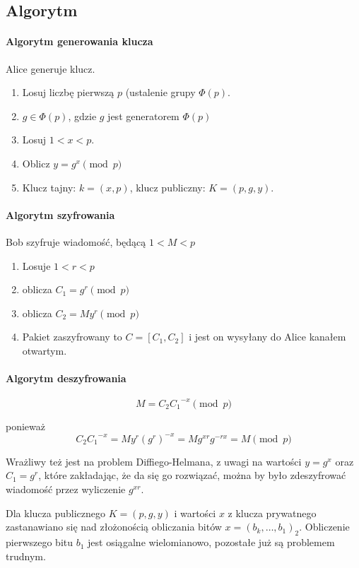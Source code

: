 \documentclass{report}
\begin{document}
\subsection{Algorytm}

\paragraph{Algorytm generowania klucza}

Alice generuje klucz.

\begin{enumerate}
\item Losuj liczbę pierwszą $p$ (ustalenie grupy $\Phi(p)$.
\item $g \in \Phi(p)$, gdzie $g$ jest generatorem $\Phi(p)$
\item Losuj $1 < x < p$.
\item Oblicz $y = g^x \pmod{p}$
\item Klucz tajny: $k = (x, p)$, klucz publiczny: $K = (p, g, y)$.
\end{enumerate}

\paragraph{Algorytm szyfrowania}

Bob szyfruje wiadomość, będącą $1 < M < p$

\begin{enumerate}
\item Losuje $ 1 < r < p$
\item oblicza $C_1 = g^r \pmod{p}$
\item oblicza $C_2 = My^r \pmod{p}$
\item Pakiet zaszyfrowany to $C = [C_1, C_2]$ i jest on wysyłany do Alice kanałem otwartym.
\end{enumerate}

\paragraph{Algorytm deszyfrowania}
$$
M = C_2 {C_1}^{-x} \pmod{p}
$$

ponieważ $$ C_2 {C_1}^{-x} = My^r(g^r)^{-x} = M g^{xr} g^{-rx} = M \pmod{p}$$

Wrażliwy też jest na problem Diffiego-Helmana, z uwagi na wartości $y = g^x$ oraz $C_1 = g^r$, które zakładając, że da się go rozwiązać, można by było zdeszyfrować wiadomość przez wyliczenie $g^{xr}$.

Dla klucza publicznego $K = (p, g, y)$ i wartości $x$ z klucza prywatnego zastanawiano się nad złożonością obliczania bitów $x = (b_k, \dots, b_1)_2$.
Obliczenie pierwszego bitu $b_1$ jest osiągalne wielomianowo, pozostałe już są problemem trudnym.
\end{document}

